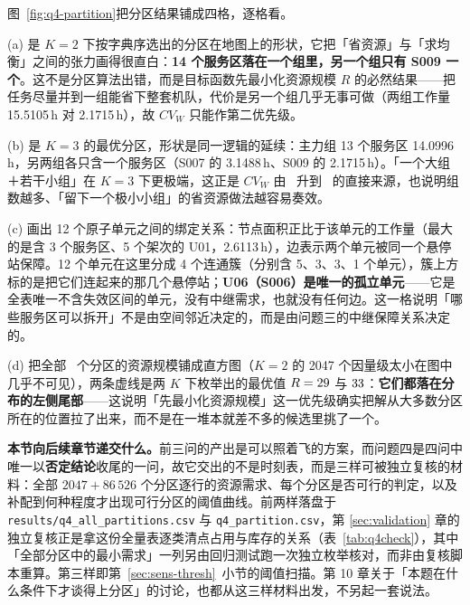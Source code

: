 图~\ref{fig:q4-partition}把分区结果铺成四格，逐格看。

(a) 是 $K=2$ 下按字典序选出的分区在地图上的形状，它把「省资源」与「求均衡」之间的张力画得很直白：\textbf{14 个服务区落在一个组里，另一个组只有 S009 一个}。这不是分区算法出错，而是目标函数先最小化资源规模 $R$ 的必然结果——把任务尽量并到一组能省下整套机队，代价是另一个组几乎无事可做（两组工作量 15.5105\,h 对 2.1715\,h），故 $CV_W$ 只能作第二优先级。

(b) 是 $K=3$ 的最优分区，形状是同一逻辑的延续：主力组 13 个服务区 14.0996\,h，另两组各只含一个服务区（S007 的 3.1488\,h、S009 的 2.1715\,h）。「一个大组＋若干小组」在 $K=3$ 下更极端，这正是 $CV_W$ 由 \mtQfourCVKTwo\ 升到 \mtQfourCVKThree\ 的直接来源，也说明组数越多、「留下一个极小小组」的省资源做法越容易奏效。

(c) 画出 12 个原子单元之间的绑定关系：节点面积正比于该单元的工作量（最大的是含 3 个服务区、5 个架次的 U01，2.6113\,h），边表示两个单元被同一个悬停站保障。12 个单元在这里分成 4 个连通簇（分别含 5、3、3、1 个单元），簇上方标的是把它们连起来的那几个悬停站；\textbf{U06（S006）是唯一的孤立单元}——它是全表唯一不含失效区间的单元，没有中继需求，也就没有任何边。这一格说明「哪些服务区可以拆开」不是由空间邻近决定的，而是由问题三的中继保障关系决定的。

(d) 把全部 \mtQfourAllPartitions\ 个分区的资源规模铺成直方图（$K=2$ 的 2047 个因量级太小在图中几乎不可见），两条虚线是两 $K$ 下枚举出的最优值 $R=29$ 与 $33$：\textbf{它们都落在分布的左侧尾部}——这说明「先最小化资源规模」这一优先级确实把解从大多数分区所在的位置拉了出来，而不是在一堆本就差不多的候选里挑了一个。

\textbf{本节向后续章节递交什么。}前三问的产出是可以照着飞的方案，而问题四是四问中唯一以\textbf{否定结论}收尾的一问，故它交出的不是时刻表，而是三样可被独立复核的材料：全部 $2047+86\,526$ 个分区逐行的资源需求、每个分区是否可行的判定，以及补配到何种程度才出现可行分区的阈值曲线。前两样落盘于 \texttt{results/q4\_all\_partitions.csv} 与 \texttt{q4\_partition.csv}，第 \ref{sec:validation} 章的独立复核正是拿这份全量表逐类清点占用与库存的关系（表~\ref{tab:q4check}），其中「全部分区中的最小需求」一列另由回归测试跑一次独立枚举核对，而非由复核脚本重算。第三样即第~\ref{sec:sens-thresh}~小节的阈值扫描。第 10 章关于「本题在什么条件下才谈得上分区」的讨论，也都从这三样材料出发，不另起一套说法。
